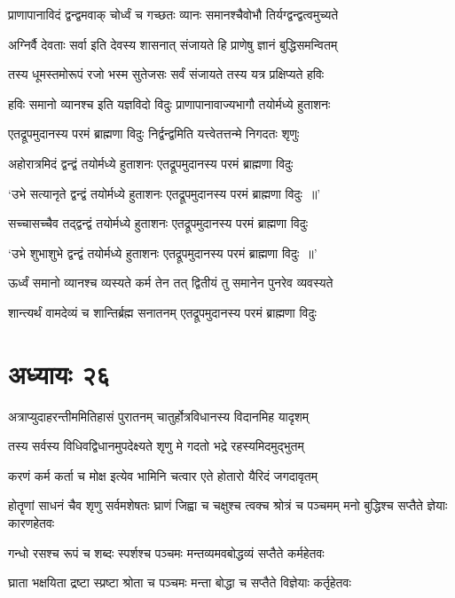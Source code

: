 \twolineshloka
{प्राणापानाविदं द्वन्द्वमवाक् चोर्ध्वं च गच्छतः}
{व्यानः समानश्चैवोभौ तिर्यग्द्वन्द्वत्वमुच्यते}


\twolineshloka
{अग्निर्वै देवताः सर्वा इति देवस्य शासनात्}
{संजायते हि प्राणेषु ज्ञानं बुद्धिसमन्वितम्}


\twolineshloka
{तस्य धूमस्तमोरूपं रजो भस्म सुतेजसः}
{सर्वं संजायते तस्य यत्र प्रक्षिप्यते हविः}


\twolineshloka
{हविः समानो व्यानश्च इति यज्ञविदो विदुः}
{प्राणापानावाज्यभागौ तयोर्मध्ये हुताशनः}


\twolineshloka
{एतद्रूपमुदानस्य परमं ब्राह्मणा विदुः}
{निर्द्वन्द्वमिति यत्त्वेतत्तन्मे निगदतः शृणुः}


\twolineshloka
{अहोरात्रमिदं द्वन्द्वं तयोर्मध्ये हुताशनः}
{एतद्रूपमुदानस्य परमं ब्राह्मणा विदुः}


\twolineshloka
{`उभे सत्यानृते द्वन्द्वं तयोर्मध्ये हुताशनः}
{एतद्रूपमुदानस्य परमं ब्राह्मणा विदुः ॥'}


\twolineshloka
{सच्चासच्चैव तद्द्वन्द्वं तयोर्मध्ये हुताशनः}
{एतद्रूपमुदानस्य परमं ब्राह्मणा विदुः}


\twolineshloka
{`उभे शुभाशुभे द्वन्द्वं तयोर्मध्ये हुताशनः}
{एतद्रूपमुदानस्य परमं ब्राह्मणा विदुः ॥'}


\twolineshloka
{ऊर्ध्वं समानो व्यानश्च व्यस्यते कर्म तेन तत्}
{द्वितीयं तु समानेन पुनरेव व्यवस्यते}


\twolineshloka
{शान्त्यर्थं वामदेव्यं च शान्तिर्ब्रह्म सनातनम्}
{एतद्रूपमुदानस्य परमं ब्राह्मणा विदुः}


\chapter{अध्यायः २६}
\twolineshloka
{अत्राप्युदाहरन्तीममितिहासं पुरातनम्}
{चातुर्होत्रविधानस्य विदानमिह यादृशम्}


\twolineshloka
{तस्य सर्वस्य विधिवद्विधानमुपदेक्ष्यते}
{शृणु मे गदतो भद्रे रहस्यमिदमुद्भुतम्}


\twolineshloka
{करणं कर्म कर्ता च मोक्ष इत्येव भामिनि}
{चत्वार एते होतारो यैरिदं जगदावृतम्}


\threelineshloka
{होतॄणां साधनं चैव शृणु सर्वमशेषतः}
{घ्राणं जिह्वा च चक्षुश्च त्वक्च श्रोत्रं च पञ्चमम्}
{मनो बुद्धिश्च सप्तैते ज्ञेयाः कारणहेतवः}


\twolineshloka
{गन्धो रसश्च रूपं च शब्दः स्पर्शश्च पञ्चमः}
{मन्तव्यमवबोद्धव्यं सप्तैते कर्महेतवः}


\twolineshloka
{घ्राता भक्षयिता द्रष्टा स्प्रष्टा श्रोता च पञ्चमः}
{मन्ता बोद्धा च सप्तैते विज्ञेयाः कर्तृहेतवः}



